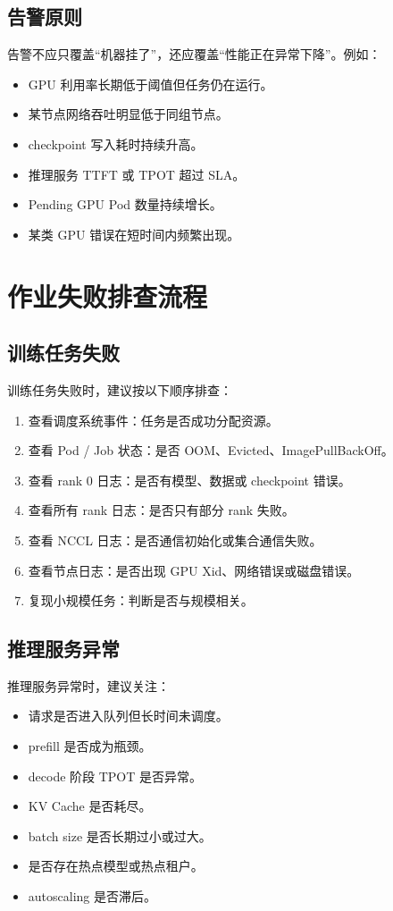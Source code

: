 \subsection{告警原则}

告警不应只覆盖“机器挂了”，还应覆盖“性能正在异常下降”。例如：

\begin{itemize}
\item GPU 利用率长期低于阈值但任务仍在运行。
\item 某节点网络吞吐明显低于同组节点。
\item checkpoint 写入耗时持续升高。
\item 推理服务 TTFT 或 TPOT 超过 SLA。
\item Pending GPU Pod 数量持续增长。
\item 某类 GPU 错误在短时间内频繁出现。
\end{itemize}

\section{作业失败排查流程}

\subsection{训练任务失败}

训练任务失败时，建议按以下顺序排查：

\begin{enumerate}
\item 查看调度系统事件：任务是否成功分配资源。
\item 查看 Pod / Job 状态：是否 OOM、Evicted、ImagePullBackOff。
\item 查看 rank 0 日志：是否有模型、数据或 checkpoint 错误。
\item 查看所有 rank 日志：是否只有部分 rank 失败。
\item 查看 NCCL 日志：是否通信初始化或集合通信失败。
\item 查看节点日志：是否出现 GPU Xid、网络错误或磁盘错误。
\item 复现小规模任务：判断是否与规模相关。
\end{enumerate}

\subsection{推理服务异常}

推理服务异常时，建议关注：

\begin{itemize}
\item 请求是否进入队列但长时间未调度。
\item prefill 是否成为瓶颈。
\item decode 阶段 TPOT 是否异常。
\item KV Cache 是否耗尽。
\item batch size 是否长期过小或过大。
\item 是否存在热点模型或热点租户。
\item autoscaling 是否滞后。
\end{itemize}

